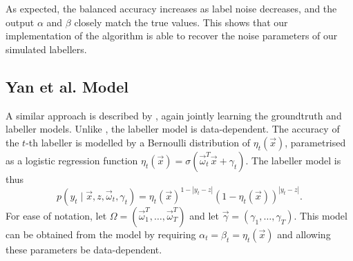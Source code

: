             As expected, the balanced accuracy increases as label noise
            decreases, and the output $\alpha$ and $\beta$ closely match the
            true values. This shows that our implementation of the
            \citeauthor{raykar10} algorithm is able to recover the noise
            parameters of our simulated labellers.

    \subsection{Yan et al. Model}
    \label{sec:yan}

        A similar approach is described by \citet{yan10}, again jointly learning
        the groundtruth and labeller models. Unlike \citeauthor{raykar10}, the
        \citeauthor{yan10} labeller model is data-dependent. The accuracy of the
        $t$-th labeller is modelled by a Bernoulli distribution of $\eta_t(\vec
        x)$, parametrised as a logistic regression function $\eta_t(\vec x) =
        \sigma(\vec \omega_t^T \vec x + \gamma_t)$. The labeller model is thus
        \begin{equation*}
            p(y_t \mid \vec x, z, \vec \omega_t, \gamma_t) =
                \eta_t(\vec x)^{1 - |y_t - z|} (1 - \eta_t(\vec x))^{|y_t - z|}.
        \end{equation*}
        For ease of notation, let $\Omega = (\vec \omega_1^T, \dots,
        \vec \omega_T^T)$ and let $\vec \gamma = (\gamma_1, \dots, \gamma_T)$.
        This model can be obtained from the \citeauthor{raykar10} model by
        requiring $\alpha_t = \beta_t = \eta_t(\vec x)$ and allowing these
        parameters be data-dependent.

